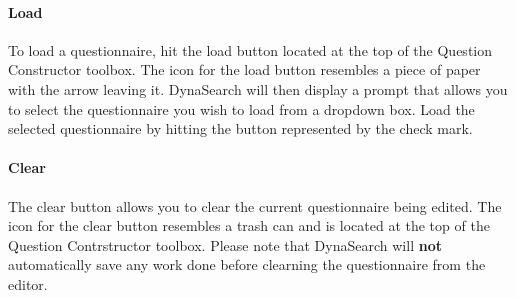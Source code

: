 \documentclass[article]{ij4uq}              %
\begin{document}
\paragraph{Load}
To load a questionnaire, hit the load button located at the top of the Question Constructor toolbox. The icon for the load button resembles a piece of paper with the arrow leaving it.  DynaSearch will then display a prompt that allows you to select the questionnaire you wish to load from a dropdown box.  Load the selected questionnaire by hitting the button represented by the check mark.

\paragraph{Clear}
The clear button allows you to clear the current questionnaire being edited.  The icon for the clear button resembles a trash can and is located at the top of the Question Contrstructor toolbox.  Please note that DynaSearch will \textbf{not} automatically save any work done before clearning the questionnaire from the editor.




\end{document}
